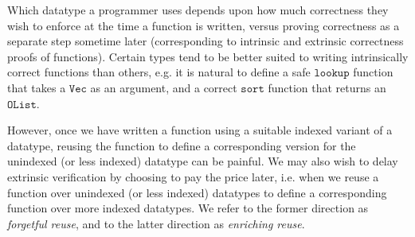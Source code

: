 \documentclass[acmsmall,screen]{acmart}
\newcommand{\txt}[1]{\ensuremath{\texttt{#1}}}
\begin{document}
Which datatype a programmer uses depends upon how much correctness
they wish to enforce at the time a function is written, versus proving
correctness as a separate step sometime later (corresponding to
intrinsic and extrinsic correctness proofs of functions). Certain
types tend to be better suited to writing intrinsically correct
functions than others, e.g. it is natural to define a safe \txt{lookup}
function that takes a \txt{Vec} as an argument, and a correct \txt{sort}
function that returns an \txt{OList}.

However, once we have written a function using a suitable indexed
variant of a datatype, reusing the function to define a corresponding version
for the unindexed (or less indexed) datatype can be
painful. We may also wish to delay extrinsic verification by choosing
to pay the price later, i.e. when we reuse a function over unindexed (or less
indexed) datatypes to define a corresponding function over
more indexed datatypes. We refer to the former direction as
\textit{forgetful reuse}, and to the latter direction as
\textit{enriching reuse}.
\end{document}

